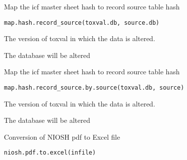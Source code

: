 \documentclass[letterpaper]{book}
\begin{document}
%
\begin{Description}\relax
Map the icf master sheet hash to record source table hash
\end{Description}
%
\begin{Usage}
\begin{verbatim}
map.hash.record_source(toxval.db, source.db)
\end{verbatim}
\end{Usage}
%
\begin{Arguments}
\begin{ldescription}
\item[\code{toxval.db}] The version of toxval in which the data is altered.
\end{ldescription}
\end{Arguments}
%
\begin{Value}
The database will be altered
\end{Value}
%
\begin{Description}\relax
Map the icf master sheet hash to record source table hash
\end{Description}
%
\begin{Usage}
\begin{verbatim}
map.hash.record_source.by.source(toxval.db, source)
\end{verbatim}
\end{Usage}
%
\begin{Arguments}
\begin{ldescription}
\item[\code{toxval.db}] The version of toxval in which the data is altered.
\end{ldescription}
\end{Arguments}
%
\begin{Value}
The database will be altered
\end{Value}
%
\begin{Description}\relax
Conversion of NIOSH pdf to Excel file
\end{Description}
%
\begin{Usage}
\begin{verbatim}
niosh.pdf.to.excel(infile)
\end{verbatim}
\end{Usage}
\end{document}
